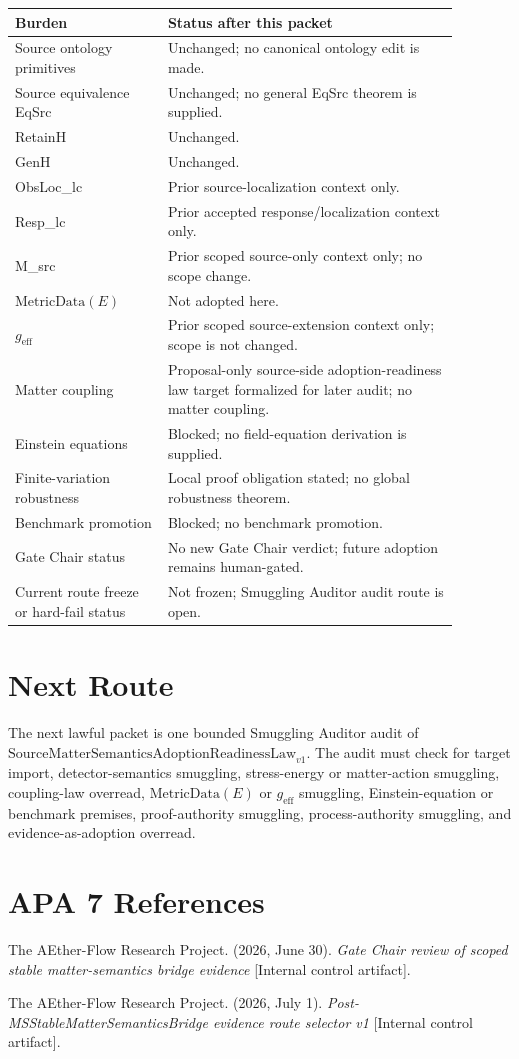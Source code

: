 \documentclass[11pt]{article}
\newcommand{\SMSAR}{\mathrm{SourceMatterSemanticsAdoptionReadinessLaw}_{v1}}
\newcommand{\MetricData}{\mathrm{MetricData}}
\newcommand{\geff}{g_{\mathrm{eff}}}
\begin{document}
\begin{longtable}{p{0.30\linewidth}p{0.58\linewidth}}
\toprule
Burden & Status after this packet \\
\midrule
Source ontology primitives & Unchanged; no canonical ontology edit is made. \\
Source equivalence EqSrc & Unchanged; no general EqSrc theorem is supplied. \\
RetainH & Unchanged. \\
GenH & Unchanged. \\
ObsLoc\_lc & Prior source-localization context only. \\
Resp\_lc & Prior accepted response/localization context only. \\
M\_src & Prior scoped source-only context only; no scope change. \\
\(\MetricData(E)\) & Not adopted here. \\
\(\geff\) & Prior scoped source-extension context only; scope is not changed. \\
Matter coupling & Proposal-only source-side adoption-readiness law target formalized for later audit; no matter coupling. \\
Einstein equations & Blocked; no field-equation derivation is supplied. \\
Finite-variation robustness & Local proof obligation stated; no global robustness theorem. \\
Benchmark promotion & Blocked; no benchmark promotion. \\
Gate Chair status & No new Gate Chair verdict; future adoption remains human-gated. \\
Current route freeze or hard-fail status & Not frozen; Smuggling Auditor audit route is open. \\
\bottomrule
\end{longtable}

\section{Next Route}

The next lawful packet is one bounded Smuggling Auditor audit of
\(\SMSAR\). The audit must check for target import, detector-semantics
smuggling, stress-energy or matter-action smuggling, coupling-law overread,
\(\MetricData(E)\) or \(\geff\) smuggling, Einstein-equation or benchmark
premises, proof-authority smuggling, process-authority smuggling, and
evidence-as-adoption overread.

\section{APA 7 References}

The AEther-Flow Research Project. (2026, June 30).
\emph{Gate Chair review of scoped stable matter-semantics bridge evidence}
[Internal control artifact].

The AEther-Flow Research Project. (2026, July 1).
\emph{Post-MSStableMatterSemanticsBridge evidence route selector v1}
[Internal control artifact].
\end{document}
